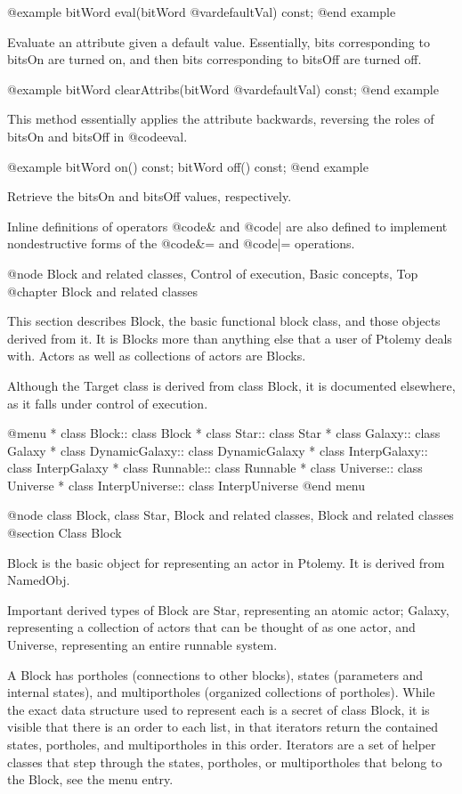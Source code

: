 @example
bitWord eval(bitWord @var{defaultVal}) const;
@end example

Evaluate an attribute given a default value.  Essentially, bits
corresponding to bitsOn are turned on, and then bits corresponding
to bitsOff are turned off.

@example
bitWord clearAttribs(bitWord @var{defaultVal}) const;
@end example

This method essentially applies the attribute backwards, reversing
the roles of bitsOn and bitsOff in @code{eval}.

@example
bitWord on() const;
bitWord off() const;
@end example

Retrieve the bitsOn and bitsOff values, respectively.

Inline definitions of operators @code{&} and @code{|} are also defined
to implement nondestructive forms of the @code{&=} and @code{|=}
operations.

@node Block and related classes, Control of execution, Basic concepts, Top
@chapter Block and related classes

This section describes Block, the basic functional block class, and
those objects derived from it.  It is Blocks more than anything else
that a user of Ptolemy deals with.  Actors as well as collections of
actors are Blocks.

Although the Target class is derived from class Block, it is documented
elsewhere, as it falls under control of execution.

@menu
* class Block::                 class Block
* class Star::                  class Star
* class Galaxy::                class Galaxy
* class DynamicGalaxy::         class DynamicGalaxy
* class InterpGalaxy::          class InterpGalaxy
* class Runnable::              class Runnable
* class Universe::              class Universe
* class InterpUniverse::        class InterpUniverse
@end menu

@node class Block, class Star, Block and related classes, Block and related classes
@section Class Block

Block is the basic object for representing an actor in Ptolemy.
It is derived from NamedObj.

Important derived types of Block are Star, representing an atomic actor;
Galaxy, representing a collection of actors that can be thought of as
one actor, and Universe, representing an entire runnable system.

A Block has portholes (connections to other blocks), states (parameters
and internal states), and multiportholes (organized collections of
portholes).  While the exact data structure used to represent each is a
secret of class Block, it is visible that there is an order to each list, in
that iterators return the contained states, portholes, and
multiportholes in this order.  Iterators are a set of helper classes
that step through the states, portholes, or multiportholes that belong
to the Block, see the menu entry.

